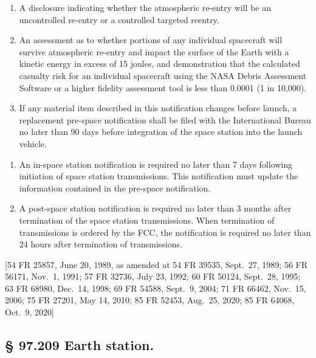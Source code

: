 \documentclass[
  letterpaper,
  DIV=11,
  numbers=noendperiod]{scrreport}
\begin{document}
\begin{enumerate}
\def\labelenumi{(\roman{enumi})}
\item
  A disclosure indicating whether the atmospheric re-entry will be an
  uncontrolled re-entry or a controlled targeted reentry.
\item
  An assessment as to whether portions of any individual spacecraft will
  survive atmospheric re-entry and impact the surface of the Earth with
  a kinetic energy in excess of 15 joules, and demonstration that the
  calculated casualty risk for an individual spacecraft using the NASA
  Debris Assessment Software or a higher fidelity assessment tool is
  less than 0.0001 (1 in 10,000).
\item
  If any material item described in this notification changes before
  launch, a replacement pre-space notification shall be filed with the
  International Bureau no later than 90 days before integration of the
  space station into the launch vehicle.
\end{enumerate}

\begin{enumerate}
\def\labelenumi{(\arabic{enumi})}
\setcounter{enumi}{1}
\item
  An in-space station notification is required no later than 7 days
  following initiation of space station transmissions. This notification
  must update the information contained in the pre-space notification.
\item
  A post-space station notification is required no later than 3 months
  after termination of the space station transmissions. When termination
  of transmissions is ordered by the FCC, the notification is required
  no later than 24 hours after termination of transmissions.
\end{enumerate}

{[}54 FR 25857, June 20, 1989, as amended at 54 FR 39535, Sept.~27,
1989; 56 FR 56171, Nov.~1, 1991; 57 FR 32736, July 23, 1992; 60 FR
50124, Sept.~28, 1995; 63 FR 68980, Dec.~14, 1998; 69 FR 54588, Sept.~9,
2004; 71 FR 66462, Nov.~15, 2006; 75 FR 27201, May 14, 2010; 85 FR
52453, Aug.~25, 2020; 85 FR 64068, Oct.~9, 2020{]}

\hypertarget{earth-station.}{%
\subsection*{§ 97.209 Earth station.}\label{earth-station.}}
\end{document}

